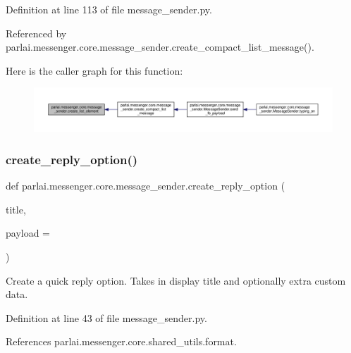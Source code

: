 Definition at line 113 of file message\+\_\+sender.\+py.



Referenced by parlai.\+messenger.\+core.\+message\+\_\+sender.\+create\+\_\+compact\+\_\+list\+\_\+message().

Here is the caller graph for this function\+:
\nopagebreak
\begin{figure}[H]
\begin{center}
\leavevmode
\includegraphics[width=350pt]{namespaceparlai_1_1messenger_1_1core_1_1message__sender_a0fb8b2849a9c5d3e0db470a399358b5b_icgraph}
\end{center}
\end{figure}
\mbox{\label{namespaceparlai_1_1messenger_1_1core_1_1message__sender_ad1b8681b56d567251598624cf3efa587}} 
\subsubsection{\texorpdfstring{create\+\_\+reply\+\_\+option()}{create\_reply\_option()}}
{\footnotesize\ttfamily def parlai.\+messenger.\+core.\+message\+\_\+sender.\+create\+\_\+reply\+\_\+option (\begin{DoxyParamCaption}\item[{}]{title,  }\item[{}]{payload = {\ttfamily \textquotesingle{}\textquotesingle{}} }\end{DoxyParamCaption})}

\begin{DoxyVerb}Create a quick reply option. Takes in display title and optionally extra
custom data.
\end{DoxyVerb}
 

Definition at line 43 of file message\+\_\+sender.\+py.



References parlai.\+messenger.\+core.\+shared\+\_\+utils.\+format.



